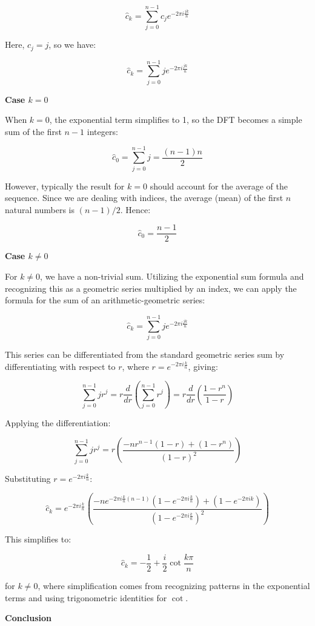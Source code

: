 \documentclass[8pt]{article}
\begin{document}
\[
\hat{c}_k = \sum_{j=0}^{n-1} c_j e^{-2\pi i \frac{jk}{n}}
\]

Here, \(c_j = j\), so we have:

\[
\hat{c}_k = \sum_{j=0}^{n-1} j e^{-2\pi i \frac{jk}{n}}
\]

\textbf{Case \(k = 0\)}

When \(k = 0\), the exponential term simplifies to 1, so the DFT becomes a simple sum of the first \(n-1\) integers:

\[
\hat{c}_0 = \sum_{j=0}^{n-1} j = \frac{(n-1) n}{2}
\]

However, typically the result for \(k = 0\) should account for the average of the sequence. Since we are dealing with indices, the average (mean) of the first \(n\) natural numbers is \((n-1)/2\). Hence:

\[
\hat{c}_0 = \frac{n-1}{2}
\]

\textbf{Case \(k \neq 0\)}

For \(k \neq 0\), we have a non-trivial sum. Utilizing the exponential sum formula and recognizing this as a geometric series multiplied by an index, we can apply the formula for the sum of an arithmetic-geometric series:

\[
\hat{c}_k = \sum_{j=0}^{n-1} j e^{-2\pi i \frac{jk}{n}}
\]

This series can be differentiated from the standard geometric series sum by differentiating with respect to \(r\), where \(r = e^{-2\pi i \frac{k}{n}}\), giving:

\[
\sum_{j=0}^{n-1} j r^j = r \frac{d}{dr} \left( \sum_{j=0}^{n-1} r^j \right) = r \frac{d}{dr} \left( \frac{1-r^n}{1-r} \right)
\]

Applying the differentiation:

\[
\sum_{j=0}^{n-1} j r^j = r \left( \frac{-nr^{n-1}(1-r) + (1-r^n)}{(1-r)^2} \right)
\]

Substituting \(r = e^{-2\pi i \frac{k}{n}}\):

\[
\hat{c}_k = e^{-2\pi i \frac{k}{n}} \left( \frac{-ne^{-2\pi i \frac{k}{n} (n-1)}(1-e^{-2\pi i \frac{k}{n}}) + (1-e^{-2\pi i k})}{(1-e^{-2\pi i \frac{k}{n}})^2} \right)
\]

This simplifies to:

\[
\hat{c}_k = -\frac{1}{2} + \frac{i}{2} \cot \frac{k\pi}{n}
\]

for \(k \neq 0\), where simplification comes from recognizing patterns in the exponential terms and using trigonometric identities for \(\cot\).

\textbf{Conclusion}
\end{document}
